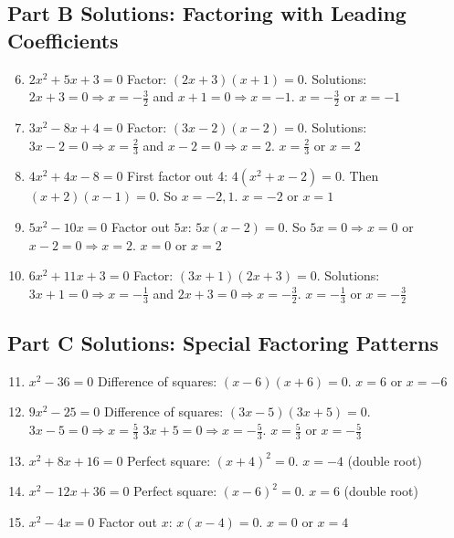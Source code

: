 \documentclass[12pt]{article}
\begin{document}
\subsection*{Part B Solutions: Factoring with Leading Coefficients}
\begin{enumerate}
  \setcounter{enumi}{5}
  \item \(2x^2 + 5x + 3 = 0\)  
  Factor: \((2x + 3)(x + 1) = 0.\)  
  Solutions: \(2x + 3 = 0 \Rightarrow x = -\tfrac{3}{2}\) and \(x + 1 = 0 \Rightarrow x = -1.\)  
  \(\boxed{x = -\tfrac{3}{2} \text{ or } x = -1}\)

  \item \(3x^2 - 8x + 4 = 0\)  
  Factor: \((3x - 2)(x - 2) = 0.\)  
  Solutions: \(3x - 2 = 0 \Rightarrow x = \tfrac{2}{3}\) and \(x - 2 = 0 \Rightarrow x = 2.\)  
  \(\boxed{x = \tfrac{2}{3} \text{ or } x = 2}\)

  \item \(4x^2 + 4x - 8 = 0\)  
  First factor out 4: \(4(x^2 + x - 2) = 0.\)  
  Then \((x + 2)(x - 1) = 0.\)  
  So \(x = -2, 1.\)  
  \(\boxed{x = -2 \text{ or } x = 1}\)

  \item \(5x^2 - 10x = 0\)  
  Factor out \(5x\): \(5x(x - 2) = 0.\)  
  So \(5x = 0 \Rightarrow x = 0\) or \(x - 2 = 0 \Rightarrow x = 2.\)  
  \(\boxed{x = 0 \text{ or } x = 2}\)

  \item \(6x^2 + 11x + 3 = 0\)  
  Factor: \((3x + 1)(2x + 3) = 0.\)  
  Solutions: \(3x + 1 = 0 \Rightarrow x = -\tfrac{1}{3}\) and \(2x + 3 = 0 \Rightarrow x = -\tfrac{3}{2}.\)  
  \(\boxed{x = -\tfrac{1}{3} \text{ or } x = -\tfrac{3}{2}}\)
\end{enumerate}

\subsection*{Part C Solutions: Special Factoring Patterns}
\begin{enumerate}
  \setcounter{enumi}{10}
  \item \(x^2 - 36 = 0\)  
  Difference of squares: \((x - 6)(x + 6) = 0.\)  
  \(\boxed{x = 6 \text{ or } x = -6}\)

  \item \(9x^2 - 25 = 0\)  
  Difference of squares: \((3x - 5)(3x + 5) = 0.\)  
  \(3x - 5 = 0 \Rightarrow x = \tfrac{5}{3}\)  
  \(3x + 5 = 0 \Rightarrow x = -\tfrac{5}{3}.\)  
  \(\boxed{x = \tfrac{5}{3} \text{ or } x = -\tfrac{5}{3}}\)

  \item \(x^2 + 8x + 16 = 0\)  
  Perfect square: \((x + 4)^2 = 0.\)  
  \(\boxed{x = -4}\) (double root)

  \item \(x^2 - 12x + 36 = 0\)  
  Perfect square: \((x - 6)^2 = 0.\)  
  \(\boxed{x = 6}\) (double root)

  \item \(x^2 - 4x = 0\)  
  Factor out \(x\): \(x(x - 4) = 0.\)  
  \(\boxed{x = 0 \text{ or } x = 4}\)
\end{enumerate}
\end{document}

